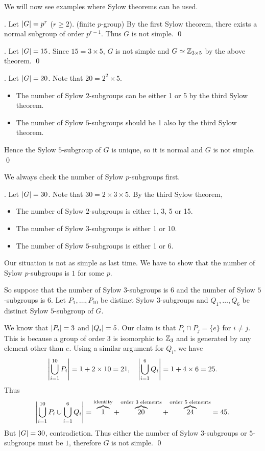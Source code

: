 \medskip

We will now see examples where Sylow theorems can be used.

\ex. Let \(\left| G \right| = p^r\) (\(r \geq 2\)). (finite \(p\)-group) By the first Sylow theorem, there exists a normal subgroup of order \(p^{r-1}\). Thus \(G\) is not simple. \qed

\ex. Let \(\left| G \right| = 15\). Since \(15 = 3 \times 5\), \(G\) is not simple and \(G \simeq \mathbb{Z}_{3\times 5}\) by the above theorem. \qed

\ex. Let \(\left| G \right| = 20\). Note that \(20 = 2^2 \times 5\).
\begin{itemize}
    \item The number of Sylow \(2\)-subgroups can be either 1 or 5 by the third Sylow theorem.
    \item The number of Sylow \(5\)-subgroups should be 1 also by the third Sylow theorem.
\end{itemize}
Hence the Sylow \(5\)-subgroup of \(G\) is unique, so it is normal and \(G\) is not simple. \qed

We always check the number of Sylow \(p\)-subgroups first.

\ex. Let \(\left| G \right| = 30\). Note that \(30 = 2 \times 3 \times 5\). By the third Sylow theorem,
\begin{itemize}
    \item The number of Sylow \(2\)-subgroups is either 1, 3, 5 or 15.
    \item The number of Sylow \(3\)-subgroups is either 1 or 10.
    \item The number of Sylow \(5\)-subgroups is either 1 or 6.
\end{itemize}
Our situation is not as simple as last time. We have to show that the number of Sylow \(p\)-subgroups is \(1\) for some \(p\).

So suppose that the number of Sylow \(3\)-subgroups is \(6\) and the number of Sylow \(5\)-subgroups is \(6\). Let \(P_1, \dots, P_{10}\) be distinct Sylow \(3\)-subgroups and \(Q_1, \dots, Q_6\) be distinct Sylow \(5\)-subgroup of \(G\).

We know that \(\left| P_i \right| = 3\) and \(\left| Q_i \right| = 5\). Our claim is that \(P_i \cap P_j = \{e\}\) for \(i \neq j\). This is because a group of order \(3\) is isomorphic to \(\mathbb{Z}_3\) and is generated by any element other than \(e\). Using a similar argument for \(Q_i\), we have
\[
    \left| \bigcup_{i=1}^{10} P_i \right| = 1 + 2 \times 10 = 21, \quad \left| \bigcup_{i=1}^6 Q_i \right| = 1 + 4 \times 6 = 25.
\]
Thus
\[
    \left| \bigcup_{i=1}^{10} P_i \cup \bigcup_{i=1}^6 Q_i \right| = \overbrace{1}^{\text{identity}} + \overbrace{20}^{\text{order 3 elements}} + \overbrace{24}^{\text{order 5 elements}} = 45.
\]
But \(\left| G \right| = 30\), contradiction. Thus either the number of Sylow \(3\)-subgroups or \(5\)-subgroups must be \(1\), therefore \(G\) is not simple. \qed

